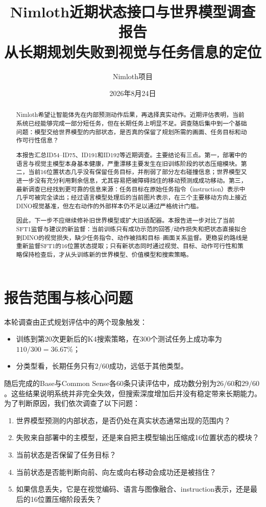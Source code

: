 \documentclass[UTF8,11pt,a4paper,fontset=none]{ctexart}
\title{\textbf{Nimloth近期状态接口与世界模型调查报告}\\[0.5em]
\large 从长期规划失败到视觉与任务信息的定位}
\author{Nimloth项目}
\date{2026年8月24日}
\begin{document}
\maketitle

\begin{abstract}
Nimloth希望让智能体先在内部预测动作后果，再选择真实动作。近期评估表明，当前系统已经能够完成一部分短任务，但在长期任务上明显不足。调查随后集中到一个基础问题：模型交给世界模型的内部状态，是否真的保留了规划所需的画面、任务目标和动作可行性信息？

本报告汇总ID54--ID75、ID191和ID192等近期调查。主要结论有三点。第一，部署中的语言与视觉主模型本身基本健康，严重漂移主要发生在旧训练阶段的状态压缩模块。第二，当前16位置状态几乎没有保留任务目标，并削弱了部分左右碰撞信息；世界模型又进一步没有充分利用剩余信息，尤其容易把被障碍挡住的移动预测成成功移动。第三，最新调查已经找到更可靠的信息来源：任务目标在原始任务指令（instruction）表示中几乎可被完全读出；经过语言模型处理后的当前图片表示，在三个主要移动方向上接近DINO视觉基准，但左右动作的外部样本仍不足以通过严格统计门槛。

因此，下一步不应继续修补旧世界模型或扩大旧适配器。本报告进一步对比了当前SFT1监督与建议的新监督：当前训练只有成功示范的回答/动作损失和把状态直接拟合到DINO的视觉损失，缺少任务指令、动作被挡和目标--画面关系监督。更稳妥的路线是重新监督SFT1的16位置状态提取；只有新状态同时通过视觉、目标、动作可行性和策略保持检查后，才从头训练新的世界模型、价值模型和搜索策略。
\end{abstract}

\tableofcontents
\newpage

\section{报告范围与核心问题}

本轮调查由正式规划评估中的两个现象触发：

\begin{itemize}
  \item 训练到第20次更新后的K4搜索策略，在300个测试任务上成功率为$110/300=36.67\%$；
  \item 分类型看，长期任务只有$2/60$成功，远低于其他类型。
\end{itemize}

随后完成的Base与Common Sense各60条只读评估中，成功数分别为$26/60$和$29/60$。这些结果说明系统并非完全失效，但搜索深度增加后并没有稳定带来长期能力。为了判断原因，我们依次调查了以下问题：

\begin{enumerate}
  \item 世界模型预测的内部状态，是否仍处在真实状态通常出现的范围内？
  \item 失败来自部署中的主模型，还是来自把主模型输出压缩成16位置状态的模块？
  \item 当前状态是否保留了任务目标？
  \item 当前状态是否能判断向前、向左或向右移动会成功还是被挡住？
  \item 如果信息丢失，它是在视觉编码、语言与图像融合、instruction表示，还是最后的16位置压缩阶段丢失？
\end{enumerate}
\end{document}
